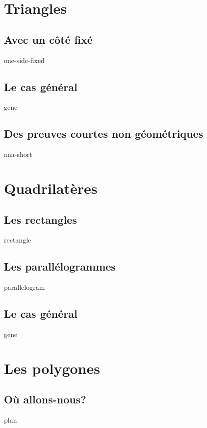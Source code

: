 \documentclass[12pt]{amsart}
\begin{document}


\section{Triangles}

\subsection{Avec un côté fixé}
{one-side-fixed}


\subsection{Le cas général}
{gene}


\subsection{Des preuves courtes non géométriques}
{ana-short}




\section{Quadrilatères}

\subsection{Les rectangles}
{rectangle}


\subsection{Les parallélogrammes}
{parallelogram}


\subsection{Le cas général}
{gene}




\section{Les polygones}

\subsection{Où allons-nous?}
{plan}
\end{document}
